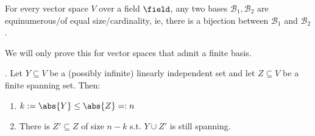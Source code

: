 \begin{theorem}\label{thm:basesofequalcardinality}
    For every vector space $V$ over a field $\field$, any two bases $\mathcal{B}_1,\mathcal{B}_2$ are equinumerous/of equal size/cardinality, ie, there is a bijection between $\mathcal{B}_1$ and $\mathcal{B}_2$.
\end{theorem}

\begin{remark}
    We will only prove this for vector spaces that admit a finite basis.
\end{remark}

\begin{lemma}\label{lemma:steinitz}
     . Let $Y \subseteq V$ be a (possibly infinite) linearly independent set and let $Z \subseteq V$ be a finite spanning set. Then:
    \begin{enumerate}
        \item $k:=\abs{Y} \leq \abs{Z} =: n$
        \item There is $Z' \subseteq Z$ of size $n -k$ s.t. $Y \cup Z'$ is still spanning.
    \end{enumerate}
\end{lemma}

